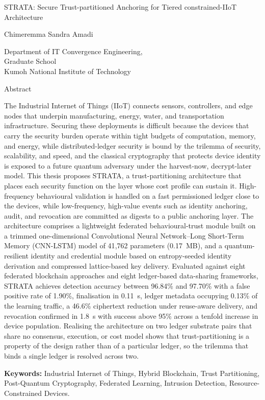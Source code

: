 \begin{titlepage}
\begin{center}
\LARGE
STRATA: Secure Trust-partitioned Anchoring for Tiered constrained-IIoT Architecture

\vspace{0.5cm}
\LARGE
Chimeremma Sandra Amadi

\vspace{0.5cm}
\Large
Department of IT Convergence Engineering,\\
Graduate School\\
Kumoh National Institute of Technology

\vspace{0.5cm}
\LARGE
Abstract
\end{center}
\large
{}

The Industrial Internet of Things (IIoT) connects sensors, controllers, and edge nodes that underpin manufacturing, energy, water, and transportation infrastructure. Securing these deployments is difficult because the devices that carry the security burden operate within tight budgets of computation, memory, and energy, while distributed-ledger security is bound by the trilemma of security, scalability, and speed, and the classical cryptography that protects device identity is exposed to a future quantum adversary under the harvest-now, decrypt-later model. This thesis proposes STRATA, a trust-partitioning architecture that places each security function on the layer whose cost profile can sustain it. High-frequency behavioural validation is handled on a fast permissioned ledger close to the devices, while low-frequency, high-value events such as identity anchoring, audit, and revocation are committed as digests to a public anchoring layer. The architecture comprises a lightweight federated behavioural-trust module built on a trimmed one-dimensional Convolutional Neural Network--Long Short-Term Memory (CNN-LSTM) model of 41{,}762 parameters (0.17~MB), and a quantum-resilient identity and credential module based on entropy-seeded identity derivation and compressed lattice-based key delivery. Evaluated against eight federated blockchain approaches and eight ledger-based data-sharing frameworks, STRATA achieves detection accuracy between 96.84\% and 97.70\% with a false positive rate of 1.90\%, finalisation in 0.11~s, ledger metadata occupying 0.13\% of the learning traffic, a 46.6\% ciphertext reduction under reuse-aware delivery, and revocation confirmed in 1.8~s with success above 95\% across a tenfold increase in device population. Realising the architecture on two ledger substrate pairs that share no consensus, execution, or cost model shows that trust-partitioning is a property of the design rather than of a particular ledger, so the trilemma that binds a single ledger is resolved across two.

\vspace{0.5cm}
\textbf{Keywords: }Industrial Internet of Things, Hybrid Blockchain, Trust Partitioning, Post-Quantum Cryptography, Federated Learning, Intrusion Detection, Resource-Constrained Devices.
\end{titlepage}
